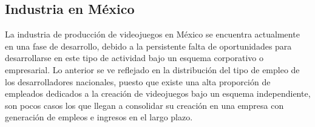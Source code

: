 \subsection{Industria en México}
La industria de producción de videojuegos en México se encuentra actualmente en una fase de desarrollo, debido a la persistente falta de oportunidades para desarrollarse en este tipo de actividad bajo un esquema corporativo o empresarial. Lo anterior se ve reflejado en la distribución del tipo de empleo de los desarrolladores nacionales, puesto que existe una alta proporción de empleados dedicados a la creación de videojuegos bajo un esquema independiente, son pocos casos los que llegan a consolidar su creación en una empresa con generación de empleos e ingresos en el largo plazo.
\\[1pt]


